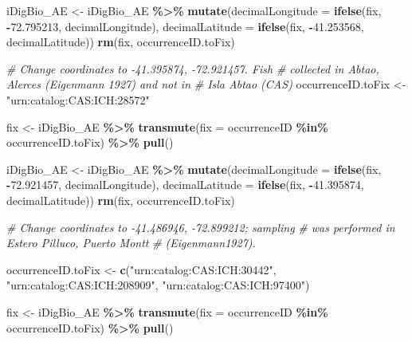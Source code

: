 \documentclass[sn-apa,pdflatex]{sn-jnl}
\newenvironment{Shaded}{\begin{snugshade}}{\end{snugshade}}
\newcommand{\AttributeTok}[1]{\textcolor[rgb]{0.13,0.29,0.53}{#1}}
\newcommand{\CommentTok}[1]{\textcolor[rgb]{0.56,0.35,0.01}{\textit{#1}}}
\newcommand{\FloatTok}[1]{\textcolor[rgb]{0.00,0.00,0.81}{#1}}
\newcommand{\FunctionTok}[1]{\textcolor[rgb]{0.13,0.29,0.53}{\textbf{#1}}}
\newcommand{\NormalTok}[1]{#1}
\newcommand{\OtherTok}[1]{\textcolor[rgb]{0.56,0.35,0.01}{#1}}
\newcommand{\SpecialCharTok}[1]{\textcolor[rgb]{0.81,0.36,0.00}{\textbf{#1}}}
\newcommand{\StringTok}[1]{\textcolor[rgb]{0.31,0.60,0.02}{#1}}
\begin{document}
\begin{Shaded}
\begin{Highlighting}[]
\NormalTok{iDigBio\_AE }\OtherTok{\textless{}{-}}\NormalTok{ iDigBio\_AE }\SpecialCharTok{\%\textgreater{}\%}
    \FunctionTok{mutate}\NormalTok{(}\AttributeTok{decimalLongitude =} \FunctionTok{ifelse}\NormalTok{(fix, }\SpecialCharTok{{-}}\FloatTok{72.795213}\NormalTok{, decimalLongitude),}
        \AttributeTok{decimalLatitude =} \FunctionTok{ifelse}\NormalTok{(fix, }\SpecialCharTok{{-}}\FloatTok{41.253568}\NormalTok{, decimalLatitude))}
\FunctionTok{rm}\NormalTok{(fix, occurrenceID.toFix)}

\CommentTok{\# Change coordinates to {-}41.395874, {-}72.921457. Fish}
\CommentTok{\# collected in Abtao, Alerces (Eigenmann 1927) and not in}
\CommentTok{\# Isla Abtao (CAS)}
\NormalTok{occurrenceID.toFix }\OtherTok{\textless{}{-}} \StringTok{"urn:catalog:CAS:ICH:28572"}

\NormalTok{fix }\OtherTok{\textless{}{-}}\NormalTok{ iDigBio\_AE }\SpecialCharTok{\%\textgreater{}\%}
    \FunctionTok{transmute}\NormalTok{(}\AttributeTok{fix =}\NormalTok{ occurrenceID }\SpecialCharTok{\%in\%}\NormalTok{ occurrenceID.toFix) }\SpecialCharTok{\%\textgreater{}\%}
    \FunctionTok{pull}\NormalTok{()}

\NormalTok{iDigBio\_AE }\OtherTok{\textless{}{-}}\NormalTok{ iDigBio\_AE }\SpecialCharTok{\%\textgreater{}\%}
    \FunctionTok{mutate}\NormalTok{(}\AttributeTok{decimalLongitude =} \FunctionTok{ifelse}\NormalTok{(fix, }\SpecialCharTok{{-}}\FloatTok{72.921457}\NormalTok{, decimalLongitude),}
        \AttributeTok{decimalLatitude =} \FunctionTok{ifelse}\NormalTok{(fix, }\SpecialCharTok{{-}}\FloatTok{41.395874}\NormalTok{, decimalLatitude))}
\FunctionTok{rm}\NormalTok{(fix, occurrenceID.toFix)}

\CommentTok{\# Change coordinates to {-}41.486946, {-}72.899212; sampling}
\CommentTok{\# was performed in Estero Pilluco, Puerto Montt}
\CommentTok{\# (Eigenmann1927).}

\NormalTok{occurrenceID.toFix }\OtherTok{\textless{}{-}} \FunctionTok{c}\NormalTok{(}\StringTok{"urn:catalog:CAS:ICH:30442"}\NormalTok{, }\StringTok{"urn:catalog:CAS:ICH:208909"}\NormalTok{,}
    \StringTok{"urn:catalog:CAS:ICH:97400"}\NormalTok{)}

\NormalTok{fix }\OtherTok{\textless{}{-}}\NormalTok{ iDigBio\_AE }\SpecialCharTok{\%\textgreater{}\%}
    \FunctionTok{transmute}\NormalTok{(}\AttributeTok{fix =}\NormalTok{ occurrenceID }\SpecialCharTok{\%in\%}\NormalTok{ occurrenceID.toFix) }\SpecialCharTok{\%\textgreater{}\%}
    \FunctionTok{pull}\NormalTok{()}


\end{Highlighting}
\end{Shaded}
\end{document}
